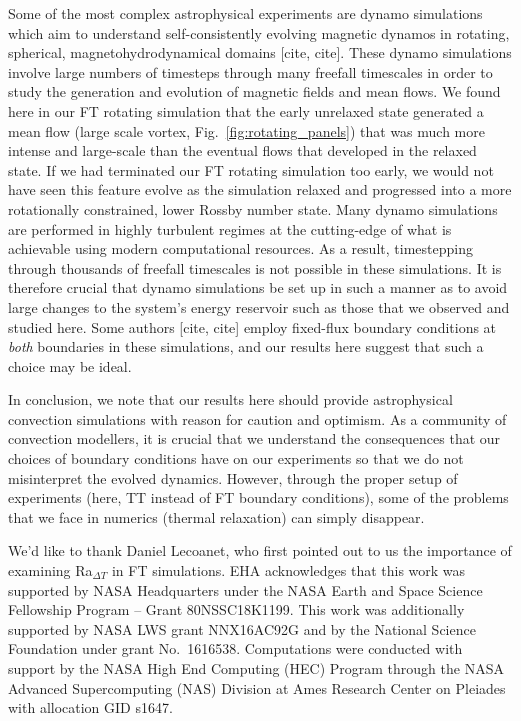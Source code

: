 \documentclass[aps, pre, onecolumn, nofootinbib, notitlepage, groupedaddress, amsfonts, amssymb, amsmath, longbibliography, superscriptaddress]{revtex4-1}
\begin{document}
Some of the most complex astrophysical experiments are dynamo simulations which aim to understand self-consistently evolving magnetic dynamos in rotating, spherical, magnetohydrodynamical domains [cite, cite].
These dynamo simulations involve large numbers of timesteps through many freefall timescales in order to study the generation and evolution of magnetic fields and mean flows.
We found here in our FT rotating simulation that the early unrelaxed state generated a mean flow (large scale vortex, Fig.~\ref{fig:rotating_panels}) that was much more intense and large-scale than the eventual flows that developed in the relaxed state.
If we had terminated our FT rotating simulation too early, we would not have seen this feature evolve as the simulation relaxed and progressed into a more rotationally constrained, lower Rossby number state.
Many dynamo simulations are performed in highly turbulent regimes at the cutting-edge of what is achievable using modern computational resources.
As a result, timestepping through thousands of freefall timescales is not possible in these simulations.
It is therefore crucial that dynamo simulations be set up in such a manner as to avoid large changes to the system's energy reservoir such as those that we observed and studied here.
Some authors [cite, cite] employ fixed-flux boundary conditions at \emph{both} boundaries in these simulations, and our results here suggest that such a choice may be ideal.

In conclusion, we note that our results here should provide astrophysical convection simulations with reason for caution and optimism.
As a community of convection modellers, it is crucial that we understand the consequences that our choices of boundary conditions have on our experiments so that we do not misinterpret the evolved dynamics.
However, through the proper setup of experiments (here, TT instead of FT boundary conditions), some of the problems that we face in numerics (thermal relaxation) can simply disappear.

\begin{acknowledgments}
We'd like to thank Daniel Lecoanet, who first pointed out to us the importance of examining Ra$_{\Delta T}$ in FT simulations. 
EHA acknowledges that this work was supported by NASA Headquarters under the NASA Earth and Space Science Fellowship Program -- Grant 80NSSC18K1199.
This work was additionally supported by NASA LWS grant NNX16AC92G and by the National Science Foundation under grant No.~1616538. 
Computations were conducted with support by the NASA High End Computing (HEC) Program through the NASA  Advanced Supercomputing (NAS) Division at Ames Research Center on Pleiades with allocation GID s1647.
\end{acknowledgments}
\end{document}

